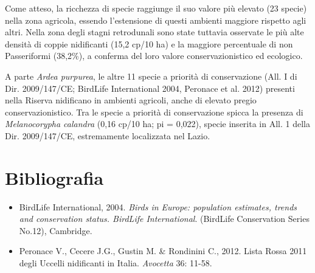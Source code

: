 Come atteso, la ricchezza di specie raggiunge il suo valore più elevato (23 specie) nella zona agricola, essendo
l{\textquoteright}estensione di questi ambienti maggiore rispetto agli altri. Nella zona degli stagni retrodunali sono state tuttavia
osservate le più alte densità di coppie nidificanti (15,2 cp/10 ha) e la maggiore percentuale di non Passeriformi
(38,2\%), a conferma del loro valore conservazionistico ed ecologico. 

A parte \textit{Ardea purpurea}, le altre 11 specie a priorità di conservazione (All. I di Dir. 2009/147/CE; BirdLife
International 2004, Peronace et al. 2012) presenti nella Riserva nidificano in ambienti agricoli, anche di elevato
pregio conservazionistico. Tra le specie a priorità di conservazione spicca la presenza di \textit{Melanocorypha
calandra} (0,16 cp/10 ha; pi = 0,022), specie inserita in All. 1 della Dir. 2009/147/CE, estremamente localizzata nel
Lazio.

\section*{Bibliografia}
\begin{itemize}\itemsep0pt
	\item BirdLife International, 2004. \textit{Birds in Europe: population estimates, trends and conservation status. BirdLife International}. (BirdLife Conservation Series No.12), Cambridge.
	\item Peronace V., Cecere J.G., Gustin M. \& Rondinini C., 2012. Lista Rossa 2011 degli Uccelli nidificanti in Italia. \textit{Avocetta} 36: 11-58.
\end{itemize}